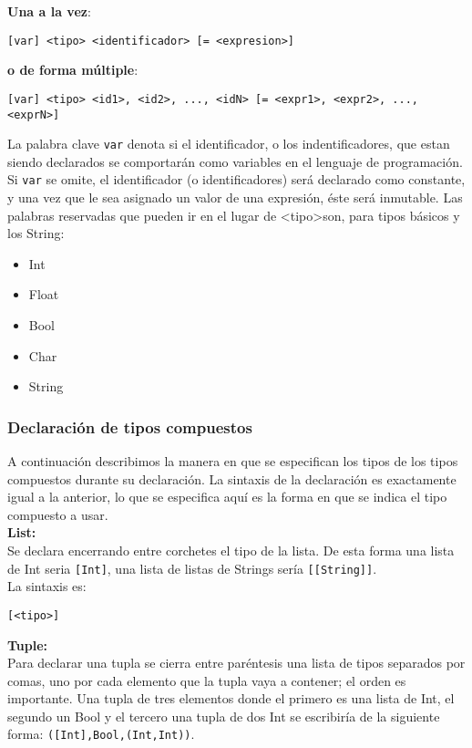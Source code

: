 \documentclass[12pt, spanish]{report}
\begin{document}
\textbf{Una a la vez}:
\begin{verbatim}
[var] <tipo> <identificador> [= <expresion>]
\end{verbatim}

\textbf{o de forma m\'ultiple}:
\begin{verbatim}
[var] <tipo> <id1>, <id2>, ..., <idN> [= <expr1>, <expr2>, ..., <exprN>]
\end{verbatim}

La palabra clave \texttt{var} denota si el identificador, o los
indentificadores, que estan siendo declarados se comportar\'an como
variables en el lenguaje de programaci\'on. Si \texttt{var} se omite,
el identificador (o identificadores) ser\'a declarado como constante,
y una vez que le sea asignado un valor de una expresi\'on, \'este
ser\'a inmutable. Las palabras reservadas que pueden ir en el lugar de
\textless tipo\textgreater son, para tipos b\'asicos y los String:

\begin{itemize}
\item Int
\item Float
\item Bool
\item Char
\item String
\end{itemize}

\subsubsection{Declaraci\'on de tipos compuestos}
\label{sec:declc}
A continuaci\'on describimos la manera en que se especifican los tipos
de los tipos compuestos durante su declaraci\'on. La sintaxis de la
declaraci\'on es exactamente igual a la anterior, lo que se especifica
aqu\'i es la forma en que se indica el tipo compuesto a usar.\\

\textbf{List:}\\
Se declara encerrando entre corchetes el tipo de la
lista. De esta forma una lista de Int seria \texttt{[Int]}, una lista
de listas de Strings ser\'ia \texttt{[[String]]}.\\

La sintaxis es:
\begin{verbatim}
[<tipo>]
\end{verbatim}

\textbf{Tuple:}\\
Para declarar una tupla se cierra entre par\'entesis una lista de
tipos separados por comas, uno por cada elemento que la tupla vaya a
contener; el orden es importante. Una tupla de tres elementos donde el
primero es una lista de Int, el segundo un Bool y el tercero una tupla
de dos Int se escribir\'ia de la siguiente forma:
\texttt{([Int],Bool,(Int,Int))}.\\
\end{document}
